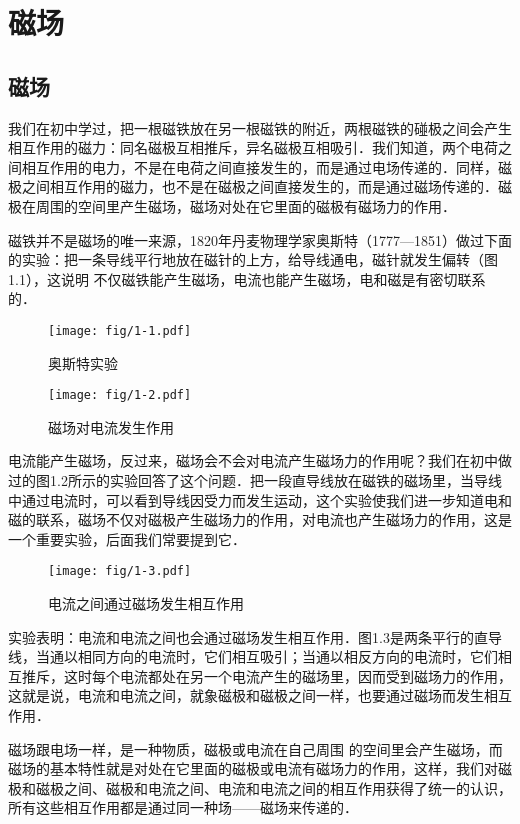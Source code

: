 \chapter{磁场}
\section{磁场}
我们在初中学过，把一根磁铁放在另一根磁铁的附近，两根磁铁的碰极之间会产生相互作用的磁力：同名磁极互相推斥，异名磁极互相吸引．我们知道，两个电荷之间相互作用的电力，不是在电荷之间直接发生的，而是通过电场传递的．同样，磁极之间相互作用的磁力，也不是在磁极之间直接发生的，而是通过磁场传递的．磁极在周围的空间里产生磁场，磁场对处在它里面的磁极有磁场力的作用．

磁铁并不是磁场的唯一来源，1820年丹麦物理学家奥斯特（1777—1851）做过下面的实验：把一条导线平行地放在磁针的上方，给导线通电，磁针就发生偏转（图1.1），这说明
不仅磁铁能产生磁场，电流也能产生磁场，电和磁是有密切联系的．
\begin{figure}[htp]
\centering
\begin{minipage}[t]{0.48\textwidth}
\centering
\texttt{[image: fig/1-1.pdf]}
\caption{奥斯特实验}
\end{minipage}
\begin{minipage}[t]{0.48\textwidth}
\centering
\texttt{[image: fig/1-2.pdf]}
\caption{磁场对电流发生作用}
\end{minipage}
\end{figure}

电流能产生磁场，反过来，磁场会不会对电流产生磁场力的作用呢？我们在初中做过的图1.2所示的实验回答了这个问题．把一段直导线放在磁铁的磁场里，当导线中通过电流时，可以看到导线因受力而发生运动，这个实验使我们进一步知道电和磁的联系，磁场不仅对磁极产生磁场力的作用，对电流也产生磁场力的作用，这是一个重要实验，后面我们常要提到它．

\begin{figure}[htp]\centering
\texttt{[image: fig/1-3.pdf]}
\caption{电流之间通过磁场发生相互作用}
\end{figure}

实验表明：电流和电流之间也会通过磁场发生相互作用．图1.3是两条平行的直导线，当通以相同方向的电流时，它们相互吸引；当通以相反方向的电流时，它们相互推斥，这时每个电流都处在另一个电流产生的磁场里，因而受到磁场力的作用，这就是说，电流和电流之间，就象磁极和磁极之间一样，也要通过磁场而发生相互作用．

磁场跟电场一样，是一种物质，磁极或电流在自己周围
的空间里会产生磁场，而磁场的基本特性就是对处在它里面的磁极或电流有磁场力的作用，这样，我们对磁极和磁极之间、磁极和电流之间、电流和电流之间的相互作用获得了统一的认识，所有这些相互作用都是通过同一种场——磁场来传递的．

